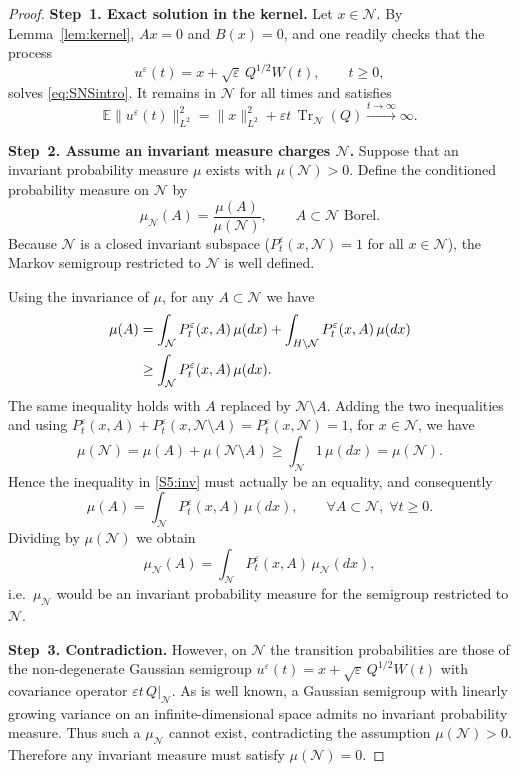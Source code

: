 \documentclass[11pt,a4paper,reqno]{amsart}
\theoremstyle{definition}
\begin{document}
\begin{proof}
  \textbf{Step~1.  Exact solution in the kernel.}
  Let $x\in\mathcal N$.  By Lemma~\ref{lem:kernel}, $A x=0$ and $B(x)=0$, and
  one readily checks that the process
  \[
    u^\varepsilon(t) = x + \sqrt\varepsilon\, Q^{1/2} W(t),\qquad t\ge 0,
  \]
  solves \eqref{eq:SNSintro}.  It remains in $\mathcal N$ for all times and satisfies
  \begin{equation}\label{eq:energy_div}
    \mathbb E\|u^\varepsilon(t)\|_{L^2}^2
    = \|x\|_{L^2}^2 + \varepsilon t\,\operatorname{Tr}_{\mathcal N}(Q)
    \xrightarrow{t\to\infty}\infty .
  \end{equation}

  \textbf{Step~2.  Assume an invariant measure charges $\mathcal N$.}
  Suppose that an invariant probability measure $\mu$ exists with
  $\mu(\mathcal N)>0$.  Define the conditioned probability measure on $\mathcal N$
  by
  \[
    \mu_{\mathcal N}(A) = \frac{\mu(A)}{\mu(\mathcal N)},\qquad
    A\subset\mathcal N\text{ Borel}.
  \]
  Because $\mathcal N$ is a closed invariant subspace
  ($P_t^\varepsilon(x,\mathcal N)=1$ for all $x\in\mathcal N$), the Markov
  semigroup restricted to $\mathcal N$ is well defined.

  Using the invariance of $\mu$, for any $A\subset\mathcal N$ we have
  \begin{align}\label{S5:inv}
    \mu(A) &= \int_{\mathcal N} P_t^\varepsilon(x,A)\,\mu(dx)
            + \int_{H\setminus\mathcal N} P_t^\varepsilon(x,A)\,\mu(dx)\notag \\
           &\ge \int_{\mathcal N} P_t^\varepsilon(x,A)\,\mu(dx).
  \end{align}
  The same inequality holds with $A$ replaced by $\mathcal N\setminus A$.
  Adding the two inequalities and using
  $P_t^\varepsilon(x,A)+P_t^\varepsilon(x,\mathcal N\setminus A)
  =P_t^\varepsilon(x,\mathcal N)=1$, for $x\in\mathcal N$, we have
  \[
    \mu(\mathcal N)
    = \mu(A)+\mu(\mathcal N\setminus A)
    \ge \int_{\mathcal N} 1\,\mu(dx) = \mu(\mathcal N).
  \]
  Hence the inequality in \eqref{S5:inv} must actually be an equality, and consequently
  \[
    \mu(A) = \int_{\mathcal N} P_t^\varepsilon(x,A)\,\mu(dx), \qquad
    \forall A\subset\mathcal N,\; \forall t\ge 0.
  \]
  Dividing by $\mu(\mathcal N)$ we obtain
  \[
    \mu_{\mathcal N}(A) = \int_{\mathcal N} P_t^\varepsilon(x,A)\,\mu_{\mathcal N}(dx),
  \]
  i.e.\ $\mu_{\mathcal N}$ would be an invariant probability measure for the
  semigroup restricted to $\mathcal N$.

  \textbf{Step~3.  Contradiction.}
  However, on $\mathcal N$ the transition probabilities are those of the
  non-degenerate Gaussian semigroup
  $u^\varepsilon(t)=x+\sqrt\varepsilon\,Q^{1/2}W(t)$ with covariance operator
  $\varepsilon t\,Q\big|_{\mathcal N}$.  As is well known, a Gaussian semigroup with linearly
  growing variance on an infinite-dimensional space admits no invariant
  probability measure.  Thus such a $\mu_{\mathcal N}$ cannot exist, contradicting
  the assumption $\mu(\mathcal N)>0$.  Therefore any invariant measure must
  satisfy $\mu(\mathcal N)=0$.
\end{proof}
\end{document}
